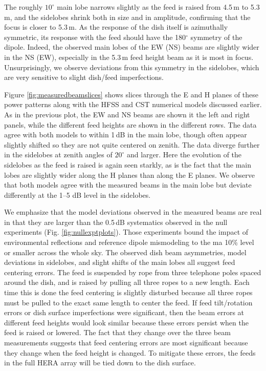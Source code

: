 \documentclass{emulateapj}
\begin{document}
The roughly $10^\circ$ main lobe narrows slightly as the feed is raised from 4.5\,m to 5.3\,m, and the sidelobes shrink both in size and in amplitude, confirming that the focus is closer to 5.3\,m. As the response of the dish itself is azimuthally symmetric, its response with the feed should have the 180$^\circ$ symmetry of the dipole. Indeed, the observed main lobes of the EW (NS) beams are slightly wider in the NS (EW), especially in the 5.3\,m feed height beam as it is most in focus. Unsurprisingly, we observe deviations from this symmetry in the sidelobes, which are very sensitive to slight dish/feed imperfections. 

Figure \ref{fig:measuredbeamslices} shows slices through the E and H planes of these power patterns along with the HFSS and CST numerical models discussed earlier. As in the previous plot, the EW and NS beams are shown it the left and right panels, while the different feed heights are shown in the different rows. The data agree with both models to within 1\,dB in the main lobe, though often appear slightly shifted so they are not quite centered on zenith. The data diverge further in the sidelobes at zenith angles of $20^\circ$ and larger. Here the evolution of the sidelobes as the feed is raised is again seen starkly, as is the fact that the main lobes are slightly wider along the H planes than along the E planes. We observe that both models agree with the measured beams in the main lobe but deviate differently at the 1--5 dB level in the sidelobes. 

We emphasize that the model deviations observed in the measured beams are real in that they are larger than the 0.5\,dB systematics observed in the null experiments (Fig. \ref{fig:nullexptplots}). Those experiments bound the impact of environmental reflections and reference dipole mismodeling to the ma 10\% level or smaller across the whole sky. The observed dish beam asymmetries, model deviations in sidelobes, and slight shifts of the main lobes all suggest feed centering errors. The feed is suspended by rope from three telephone poles spaced around the dish, and is raised by pulling all three ropes to a new length. Each time this is done the feed centering is slightly disturbed because all three ropes must be pulled to the exact same length to center the feed. If feed tilt/rotation errors or dish surface imperfections were significant, then the beam errors at different feed heights would look similar because these errors persist when the feed is raised or lowered. The fact that they change over the three beam measurements suggests that feed centering errors are most significant because they change when the feed height is changed. To mitigate these errors, the feeds in the full HERA array will be tied down to the dish surface.
\end{document}
